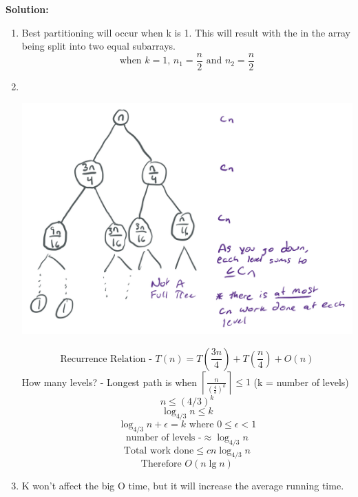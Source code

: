 \documentclass[9pt]{article}
\newcommand{\ben}{\begin{enumerate}}
\newcommand{\een}{\end{enumerate}}
\begin{document}
  \textbf{Solution:}   \\
\ben
		\item Best partitioning will occur when k is 1. This will result with the in the array being split into two equal subarrays. \\
		$$\text{when }k = 1 \text{, } n_1 = \frac{n}{2} \text{ and } n_2 = \frac{n}{2}$$
		\item  \phantom{test}  \\
		\begin{center}
		\includegraphics[scale=0.15]{hw5p1} 
		\end{center}
		$$\text{Recurrence Relation - } T(n) = T(\frac{3n}{4}) + T(\frac{n}{4}) + O(n)$$
		How many levels? - Longest path is when $ \left \lceil{\frac{n}{(\frac{4}{3})^k}}\right \rceil \leq 1 $ (k = number of levels)\\
		$$n \leq \left( 4/3 \right)^k$$
		$$ \log_{4/3}n \leq k$$
		$$ \log_{4/3}n + \epsilon = k  \text{ where } 0 \leq \epsilon < 1$$
		$$ \text{number of levels -}  \approx \log_{4/3}n $$
		$$ \text{Total work done}  \leq cn \log_{4/3}n$$
		$$ \text{Therefore } O(n \lg n)$$
		\item 
		K won't affect the big O time, but it will increase the average running time.		

\een
\fi
\newpage
\end{document}

